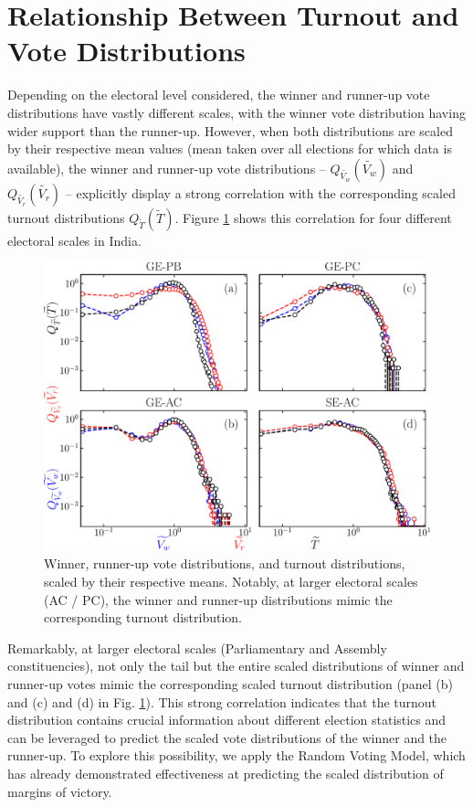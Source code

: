 \section{Relationship Between Turnout and Vote Distributions}
Depending on the electoral level considered, the winner and runner-up vote distributions have vastly different scales, with the winner vote distribution having wider support than the runner-up. However, when both distributions are scaled by their respective mean values (mean taken over all elections for which data is available), the winner and runner-up vote distributions -- $Q_{\widetilde{V_w}}(\widetilde{V_w})$ and $Q_{\widetilde{V_r}}(\widetilde{V_r})$ -- explicitly display a strong correlation with the corresponding scaled turnout distributions $Q_{\widetilde{T}}(\widetilde{T})$. Figure \ref{fig:turnout_winner_runnerup} shows this correlation for four different electoral scales in India.
\begin{figure}[H]
    \centering
    \includegraphics[width=\columnwidth]{chapters/chapter6/turnout_winner_runerup.pdf}
    \caption{Winner, runner-up vote distributions, and turnout distributions, scaled by their respective means. Notably, at larger electoral scales (AC / PC), the winner and runner-up distributions mimic the corresponding turnout distribution.}
    \label{fig:turnout_winner_runnerup}
\end{figure}
Remarkably, at larger electoral scales (Parliamentary and Assembly constituencies), not only the tail but the entire scaled distributions of winner and runner-up votes mimic the corresponding scaled turnout distribution (panel (b) and (c) and (d) in Fig. \ref{fig:turnout_winner_runnerup}). This strong correlation indicates that the turnout distribution contains crucial information about different election statistics and can be leveraged to predict the scaled vote distributions of the winner and the runner-up. To explore this possibility, we apply the Random Voting Model, which has already demonstrated effectiveness at predicting the scaled distribution of margins of victory.

